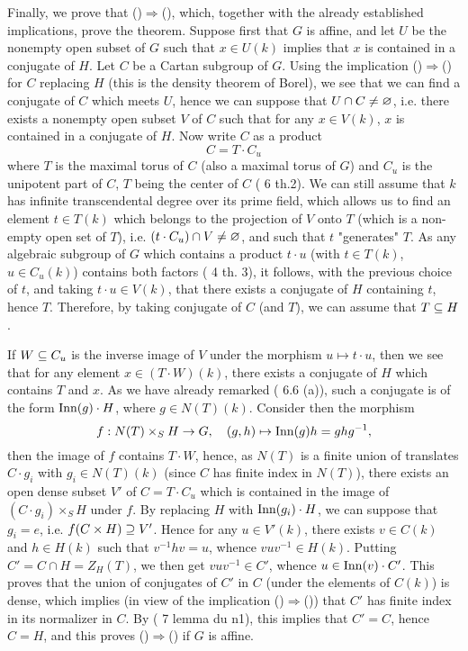 Finally, we prove that ()$\Rightarrow$(), which, together with the already established implications, prove the theorem. Suppose first that $G$ is affine, and let $U$ be the nonempty open subset of $G$ such that $x\in U(k)$ implies that $x$ is contained in a conjugate of $H$. Let $C$ be a Cartan subgroup of $G$. Using the implication ()$\Rightarrow$() for $C$ replacing $H$ (this is the density theorem of Borel), we see that we can find a conjugate of $C$ which meets $U$, hence we can suppose that $U\cap C\neq\varnothing$, i.e. there exists a nonempty open subset $V$ of $C$ such that for any $x\in V(k)$, $x$ is contained in a conjugate of $H$. Now write $C$ as a product
\[C=T\cdot C_u\]
where $T$ is the maximal torus of $C$ (also a maximal torus of $G$) and $C_u$ is the unipotent part of $C$, $T$ being the center of $C$ (\cite{Chevalley1958} 6 th.2). We can still assume that $k$ has infinite transcendental degree over its prime field, which allows us to find an element $t\in T(k)$ which belongs to the projection of $V$ onto $T$ (which is a non-empty open set of $T$), i.e. $(t\cdot C_u)\cap V\neq\varnothing$, and such that $t$ "generates" $T$. As any algebraic subgroup of $G$ which contains a product $t\cdot u$ (with $t\in T(k)$, $u\in C_u(k)$) contains both factors (\cite{Chevalley1958} 4 th. 3), it follows, with the previous choice of $t$, and taking $t\cdot u\in V(k)$, that there exists a conjugate of $H$ containing $t$, hence $T$. Therefore, by taking conjugate of $C$ (and $T$), we can assume that $T\subseteq H$.\par
If $W\subseteq C_u$ is the inverse image of $V$ under the morphism $u\mapsto t\cdot u$, then we see that for any element $x\in(T\cdot W)(k)$, there exists a conjugate of $H$ which contains $T$ and $x$. As we have already remarked (\cite{SGA3-2} 6.6 (a)), such a conjugate is of the form $\mathrm{Inn}(g)\cdot H$, where $g\in N(T)(k)$. Consider then the morphism
\[f:N(T)\times_S H\to G,\quad (g,h)\mapsto\mathrm{Inn}(g)h=ghg^{-1},\]
then the image of $f$ contains $T\cdot W$, hence, as $N(T)$ is a finite union of translates $C\cdot g_i$ with $g_i\in N(T)(k)$ (since $C$ has finite index in $N(T)$), there exists an open dense subset $V'$ of $C=T\cdot C_u$ which is contained in the image of $(C\cdot g_i)\times_S H$ under $f$. By replacing $H$ with $\mathrm{Inn}(g_i)\cdot H$, we can suppose that $g_i=e$, i.e. $f(C\times H)\supseteq V'$. Hence for any $u\in V'(k)$, there exists $v\in C(k)$ and $h\in H(k)$ such that $v^{-1}hv=u$, whence $vuv^{-1}\in H(k)$. Putting $C'=C\cap H=Z_H(T)$, we then get $vuv^{-1}\in C'$, whence $u\in\mathrm{Inn}(v)\cdot C'$. This proves that the union of conjugates of $C'$ in $C$ (under the elements of $C(k)$) is dense, which implies (in view of the implication ()$\Rightarrow$()) that $C'$ has finite index in its normalizer in $C$. By (\cite{Chevalley1958} 7 lemma du n1), this implies that $C'=C$, hence $C=H$, and this proves ()$\Rightarrow$() if $G$ is affine.\par
